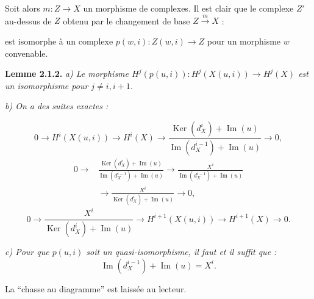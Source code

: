 \clearpage
{}%
\begingroup\small\setlength{\parskip}{0pt}\setlength{\emergencystretch}{1.5em}
\setlength{\abovedisplayskip}{4pt plus 2pt minus 2pt}%
\setlength{\belowdisplayskip}{4pt plus 2pt minus 2pt}%

Soit alors $m\colon Z\longrightarrow X$ un morphisme de complexes. Il est
clair que le complexe $Z'$ au-dessus de $Z$ obtenu par le changement de
base $Z\xrightarrow{m}X$ :

\begin{center}
\end{center}
est isomorphe à un complexe
$p(w,i)\colon Z(w,i)\longrightarrow Z$ pour un morphisme $w$ convenable.

\medskip\noindent\textbf{Lemme 2.1.2.}\quad
\textit{a) Le morphisme
$H^j(p(u,i))\colon H^j(X(u,i))\longrightarrow H^j(X)$ est un
isomorphisme pour $j\neq i,i+1$.}

\noindent\textit{b) On a des suites exactes :}

\[
0\longrightarrow H^i(X(u,i))\longrightarrow H^i(X)
\longrightarrow
\frac{\operatorname{Ker}(d_X^i)+\operatorname{Im}(u)}
 {\operatorname{Im}(d_X^{i-1})+\operatorname{Im}(u)}
\longrightarrow0,
\]
\[
\begin{aligned}
0\longrightarrow{}&
\frac{\operatorname{Ker}(d_X^i)+\operatorname{Im}(u)}
 {\operatorname{Im}(d_X^{i-1})+\operatorname{Im}(u)}
\longrightarrow
\frac{X^i}{\operatorname{Im}(d_X^{i-1})+\operatorname{Im}(u)}\\
&\longrightarrow
\frac{X^i}{\operatorname{Ker}(d_X^i)+\operatorname{Im}(u)}
\longrightarrow0,
\end{aligned}
\]
\[
0\longrightarrow
\frac{X^i}{\operatorname{Ker}(d_X^i)+\operatorname{Im}(u)}
\longrightarrow H^{i+1}(X(u,i))
\longrightarrow H^{i+1}(X)\longrightarrow0.
\]

\noindent\textit{c) Pour que $p(u,i)$ soit un quasi-isomorphisme, il
faut et il suffit que :}
\[
\operatorname{Im}(d_X^{i-1})+\operatorname{Im}(u)=X^i.
\]

La ``chasse au diagramme'' est laissée au lecteur.

